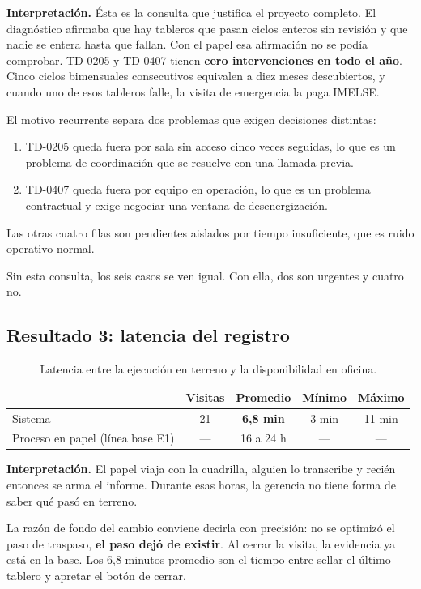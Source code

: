 \documentclass[10pt,letterpaper]{article}
\begin{document}
\textbf{Interpretación.} Ésta es la consulta que justifica el proyecto
completo. El diagnóstico afirmaba que hay tableros que pasan ciclos enteros sin
revisión y que nadie se entera hasta que fallan. Con el papel esa afirmación no
se podía comprobar.
\newpage
TD-0205 y TD-0407 tienen \textbf{cero intervenciones en todo el año}. Cinco
ciclos bimensuales consecutivos equivalen a diez meses descubiertos, y cuando
uno de esos tableros falle, la visita de emergencia la paga IMELSE.

El motivo recurrente separa dos problemas que exigen decisiones distintas:
\begin{enumerate}
    \item TD-0205 queda fuera por sala sin acceso cinco veces seguidas, lo que es un problema de coordinación que se resuelve con una llamada previa.
    \item TD-0407 queda fuera por equipo en operación, lo que es un problema contractual y exige negociar una ventana de desenergización.
\end{enumerate}
  Las otras cuatro filas son pendientes
aislados por tiempo insuficiente, que es ruido operativo normal.

Sin esta consulta, los seis casos se ven igual. Con ella, dos son urgentes y
cuatro no.

\subsection{Resultado 3: latencia del registro}

\begin{table}[H]
\centering
\small
\begin{tabular}{@{}lcccc@{}}
\toprule
& \textbf{Visitas} & \textbf{Promedio} & \textbf{Mínimo} & \textbf{Máximo} \\
\midrule
Sistema & 21 & \textbf{6,8 min} & 3 min & 11 min \\
Proceso en papel (línea base E1) & --- & 16 a 24 h & --- & --- \\
\bottomrule
\end{tabular}
\caption{Latencia entre la ejecución en terreno y la disponibilidad en oficina.}
\end{table}

\textbf{Interpretación.} El papel viaja con la cuadrilla, alguien lo transcribe
y recién entonces se arma el informe. Durante esas horas, la gerencia no tiene
forma de saber qué pasó en terreno.

La razón de fondo del cambio conviene decirla con precisión: no se optimizó el
paso de traspaso, \textbf{el paso dejó de existir}. Al cerrar la visita, la
evidencia ya está en la base. Los 6,8 minutos promedio son el tiempo entre
sellar el último tablero y apretar el botón de cerrar.
\end{document}
